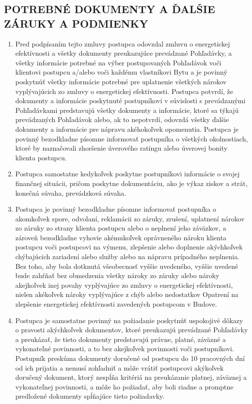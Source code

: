 \documentclass[a4paper]{article}
\begin{document}
\begin{multicols}{2}

  \subsection{POTREBNÉ DOKUMENTY A ĎALŠIE ZÁRUKY A PODMIENKY}

  \begin{enumerate}
    \item{	Pred podpísaním tejto zmluvy postupca odovzdal zmluvu o energetickej efektívnosti a všetky dokumenty preukazujúce prevádzané Pohľadávky, a všetky informácie potrebné na výber postupovaných Pohľadávok voči klientovi postupcu a/alebo voči každému vlastníkovi Bytu a je povinný poskytnúť všetky informácie potrebné pre uplatnenie všetkých nárokov vyplývajúcich zo zmluvy o energetickej efektívnosti. Postupca potvrdí, že dokumenty a informácie poskytnuté postupníkovi v súvislosti s prevádzanými Pohľadávkami predstavujú všetky dokumenty a informácie, ktoré sa týkajú prevádzaných Pohľadávok alebo, ak to nepotvrdí, odovzdá všetky ďalšie dokumenty a informácie pre nápravu akéhokoľvek opomenutia. Postupca je povinný bezodkladne písomne informovať postupníka o všetkých okolnostiach, ktoré by naznačovali zhoršenie úverového ratingu alebo úverovej bonity klienta postupcu.}
    \item{	Postupca samostatne kedykoľvek poskytne postupníkovi informácie o svojej finančnej situácii, pričom poskytne dokumentáciu, ako je výkaz ziskov a strát, konečná súvaha, prevádzková súvaha.}
    \item{	Postupca je povinný bezodkladne písomne informovať postupníka o akomkoľvek spore, odvolaní, reklamácii zo záruky, zrušení, uplatnení nárokov zo záruky zo strany klienta postupcu alebo o neplnení jeho záväzkov, a zároveň bezodkladne vyhovie akémukoľvek oprávneného nároku klienta postupcu voči postupcovi na výmenu, zlepšenie alebo doplnenie akýchkoľvek chýbajúcich zariadení alebo služby alebo na nápravu prípadného neplnenia. Bez toho, aby bola dotknutá všeobecnosť vyššie uvedeného, vyššie uvedené bude zahŕňať bez obmedzenia všetky nároky zo záruky alebo nároky akejkoľvek inej povahy vyplývajúce zo zmluvy o energetickej efektívnosti, nielen akékoľvek nároky vyplývajúce z chýb alebo nedostatkov Opatrení na zlepšenie energetickej efektívnosti zavedených postupcom v Budove.}
    \item{	Postupca je samostatne povinný na požiadanie poskytnúť uspokojivé dôkazy o pravosti akýchkoľvek dokumentov, ktoré preukazujú prevádzané Pohľadávky a preukázať, že tieto dokumenty predstavujú právne, platné, záväzné a vykonateľné povinnosti, a to bez akejkoľvek povinnosti voči postupníkovi. Postupník preskúma dokumenty doručené od postupcu do 10 pracovných dní od ich prijatia a nemusí zohľadniť a môže vrátiť postupcovi akýkoľvek doručený dokument, ktorý nespĺňa kritériá na preukázanie platnej, záväznej a vykonateľnej povinnosti, a môže ho požiadať, aby boli riadne a promptne predložené dokumenty spĺňajúce tieto požiadavky.}

\end{enumerate}
\end{multicols}
\end{document}
